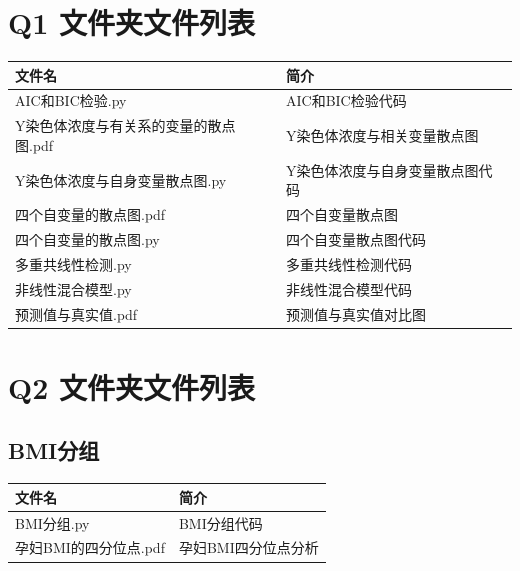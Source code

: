 \documentclass[a4paper, oneside, 12pt]{article}
\begin{document}
\section*{Q1 文件夹文件列表}
\begin{table}[H]
    \centering
    \fangsong
    \begin{tabularx}{\textwidth}{>{\RaggedRight}X >{\RaggedRight}X}
        \toprule
        \textbf{文件名}          & \textbf{简介}      \\
        \midrule
        AIC和BIC检验.py          & AIC和BIC检验代码      \\
        Y染色体浓度与有关系的变量的散点图.pdf & Y染色体浓度与相关变量散点图   \\
        Y染色体浓度与自身变量散点图.py     & Y染色体浓度与自身变量散点图代码 \\
        四个自变量的散点图.pdf         & 四个自变量散点图         \\
        四个自变量的散点图.py          & 四个自变量散点图代码       \\
        多重共线性检测.py            & 多重共线性检测代码        \\
        非线性混合模型.py            & 非线性混合模型代码        \\
        预测值与真实值.pdf           & 预测值与真实值对比图       \\
        \bottomrule
    \end{tabularx}
\end{table}

\section*{Q2 文件夹文件列表}
\subsection*{BMI分组}
\begin{table}[H]
    \centering
    \fangsong
    \begin{tabularx}{\textwidth}{>{\RaggedRight}X >{\RaggedRight}X}
        \toprule
        \textbf{文件名}   & \textbf{简介} \\
        \midrule
        BMI分组.py       & BMI分组代码     \\
        孕妇BMI的四分位点.pdf & 孕妇BMI四分位点分析 \\
        \bottomrule
    \end{tabularx}
\end{table}
\end{document}
